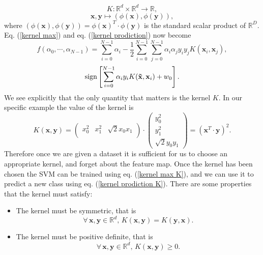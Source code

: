 \documentclass[12pt]{article}
\begin{document}
$$K:\mathbb{R}^d\times \mathbb{R}^d\rightarrow \mathbb{R},$$
\begin{equation}
    \mathbf{x}, \mathbf{y}\mapsto(\phi(\mathbf{x}), \phi(\mathbf{y})),
\end{equation}
 where $(\phi(\mathbf{x}), \phi(\mathbf{y}))=\phi(\mathbf{x})^T\cdot \phi(\mathbf{y})$ is the standard scalar product of $\mathbb{R}^D$. Eq. (\ref{kernel max}) and eq. (\ref{kernel prodiction}) now become 
 \begin{equation}
    f(\alpha_0,\cdots,\alpha_{N-1})=\sum_{i=0}^{N-1} \alpha_i-\frac{1}{2}\sum_{i=0}^{N-1}\sum_{j=0}^{N-1}\alpha_i\alpha_jy_iy_jK(\mathbf{x}_i,\mathbf{x}_j),
    \label{kernel max K}
\end{equation}
\begin{equation}
    \textup{sign}\left[\sum_{i=0}^{N-1}\alpha_iy_iK(\mathbf{\tilde{x}}, \mathbf{x}_i)+w_0\right].
    \label{kernel prodiction K}
\end{equation}
We see explicitly that the only quantity that matters is the kernel $K$. In our specific example the value of the kernel is 
\begin{equation}
    K(\mathbf{x}, \mathbf{y})= \begin{pmatrix}
        x_0^2 & x_1^2 & \sqrt{2}x_0x_1 \\
        \end{pmatrix}\cdot       \begin{pmatrix}
            y_0^2 \\
            y_1^2\\
            \sqrt{2}y_0y_1
            \end{pmatrix}=(\mathbf{x}^T\cdot\mathbf{y})^2.   
            \label{polykernel ex}   
\end{equation}
Therefore once we are given a dataset it is sufficient for us to choose an appropriate kernel, and forget about the feature map. Once the kernel has been chosen the SVM can be trained using eq. (\ref{kernel max K}), and we can use it to predict a new class using eq. (\ref{kernel prodiction K}). There are some properties that the kernel must satisfy:
\begin{itemize}
    \item The kernel must be symmetric, that is $$\forall\, \mathbf{x},\mathbf{y}\in \mathbb{R}^d,\,K(\mathbf{x},\mathbf{y})=K(\mathbf{y},\mathbf{x}).$$
    \item The kernel must be positive definite, that is $$\forall\, \mathbf{x},\mathbf{y}\in \mathbb{R}^d,\,K(\mathbf{x},\mathbf{y})\geq 0.$$
\end{itemize}
\end{document}

